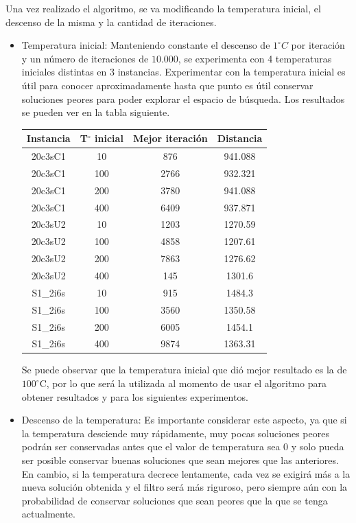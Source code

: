 \documentclass[letter, 10pt]{article}
\begin{document}
Una vez realizado el algoritmo, se va modificando la temperatura inicial, el descenso de la misma y la cantidad de iteraciones.
\begin{itemize}
\item Temperatura inicial: Manteniendo constante el descenso de $1^{\circ}C$ por iteración y un número de iteraciones de $10.000$, se experimenta con 4 temperaturas iniciales distintas en 3 instancias. Experimentar con la temperatura inicial es útil para conocer aproximadamente hasta que punto es útil conservar soluciones peores para poder explorar el espacio de búsqueda. Los resultados se pueden ver en la tabla siguiente.

\begin{center}
\begin{tabular}{|c|c|c|c|}
	\hline
	Instancia & T\(^{\circ}\) inicial & Mejor iteración & Distancia\\
	\hline
	20c3sC1 	& 10  & 876  & 941.088\\
	20c3sC1		& 100 & 2766 & 932.321\\
	20c3sC1		& 200 & 3780 & 941.088\\	
	20c3sC1		& 400 & 6409 & 937.871\\
	\hline
	20c3sU2 	& 10  & 1203 & 1270.59\\
	20c3sU2		& 100 & 4858 & 1207.61\\ 
	20c3sU2		& 200 & 7863 & 1276.62\\		
	20c3sU2		& 400 & 145  & 1301.6\\
	\hline
	S1\_2i6s 	& 10  & 915  & 1484.3\\
	S1\_2i6s 	& 100 & 3560 & 1350.58\\
	S1\_2i6s 	& 200 & 6005 & 1454.1\\
	S1\_2i6s 	& 400 & 9874 & 1363.31\\
	\hline
\end{tabular}
\end{center}

Se puede observar que la temperatura inicial que dió mejor resultado es la de $100^\circ$C, por lo que será la utilizada al momento de usar el algoritmo para obtener resultados y para los siguientes experimentos.

\item Descenso de la temperatura: Es importante considerar este aspecto, ya que si la temperatura desciende muy rápidamente, muy pocas soluciones peores podrán ser conservadas antes que el valor de temperatura sea 0 y solo pueda ser posible conservar buenas soluciones que sean mejores que las anteriores. En cambio, si la temperatura decrece lentamente, cada vez se exigirá más a la nueva solución obtenida y el filtro será más riguroso, pero siempre aún con la probabilidad de conservar soluciones que sean peores que la que se tenga actualmente.


\end{itemize}
\end{document}
